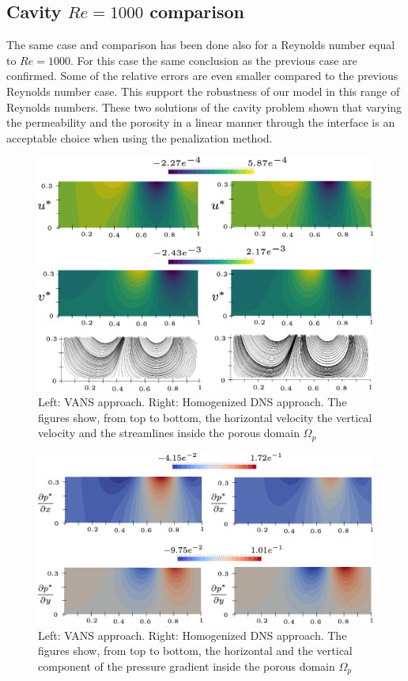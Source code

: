 \subsection{Cavity $Re=1000$ comparison}

The same case and comparison has been done also for a Reynolds number equal to $Re=1000$.
For this case the same conclusion as the previous case are confirmed. Some of the relative errors are even smaller compared to the previous Reynolds number case. This support the robustness of our model in this range of Reynolds numbers.
These two solutions of the cavity problem shown that varying the permeability and the porosity in a linear manner through the interface is an acceptable choice when using the penalization method.

\begin{figure}[H]
	\centering
	\includegraphics[width=1\linewidth]{chapter_5/figure/re1000/vans_u}
	\caption{Left: VANS approach. Right: Homogenized DNS approach. The figures show, from top to bottom, the horizontal velocity the vertical velocity and the streamlines inside the porous domain $\Omega_p$}
	\label{fig:1000_u}
\end{figure}

\begin{figure}[H]
	\centering
	\includegraphics[width=1\linewidth]{chapter_5/figure/re1000/vans_p}
	\caption{Left: VANS approach. Right: Homogenized DNS approach. The figures show, from top to bottom, the horizontal and the vertical component of the pressure gradient inside the porous domain $\Omega_p$}
	\label{fig:1000_p}
\end{figure}

